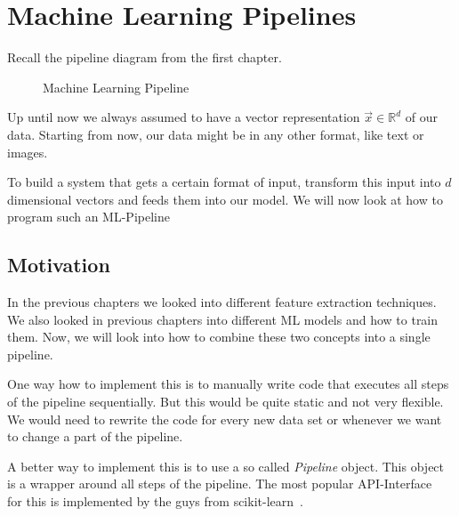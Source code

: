 \chapter{Machine Learning Pipelines}
Recall the pipeline diagram from the first chapter.

\begin{figure}[h]
  \centering
  \caption{Machine Learning Pipeline}
  \label{fig:ml-pipeline}
\end{figure}
Up until now we always assumed to have a vector representation $\vec{x}\in\mathbb{R}^d$ of our data.
Starting from now, our data might be in any other format, like text or images.

To build a system that gets a certain format of input, transform this input into $d$ dimensional vectors and feeds them into our model.
We will now look at how to program such an ML-Pipeline
\section{Motivation}
In the previous chapters we looked into different feature extraction techniques.
We also looked in previous chapters into different ML models and how to train them.
Now, we will look into how to combine these two concepts into a single pipeline.

One way how to implement this is to manually write code that executes all steps of the pipeline sequentially.
But this would be quite static and not very flexible. We would need to rewrite the code for every new data set or whenever
we want to change a part of the pipeline.

A better way to implement this is to use a so called \textit{Pipeline} object. This object is a wrapper around all steps of the pipeline.
The most popular API-Interface~\cite{sklearn_api} for this is implemented by the guys from scikit-learn~\cite{scikit-learn}.

